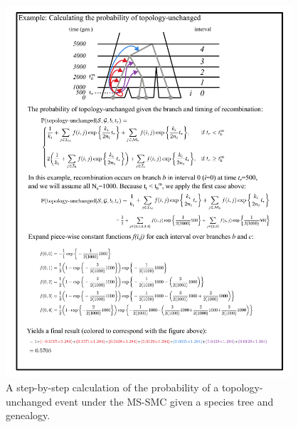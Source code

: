 \documentclass[11pt]{article}
\begin{document}
\begin{figure}[p]
	\centering
	\includegraphics[width=0.95\textwidth]{figures/verbose-equations-topology}
	\caption{A step-by-step calculation of the probability of a topology-unchanged 
	event under the MS-SMC given a species tree and genealogy.
	}
	\label{fig:figS-topo-equations}
\end{figure}



\end{document}
